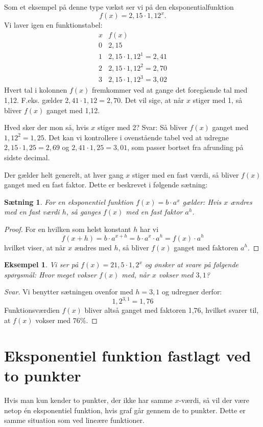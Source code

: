 \documentclass[12pt,oneside,a4paper]{article}
\theoremstyle{plain}
\newtheorem*{thm}{Sætning}
\newtheorem*{eks}{Eksempel}
\begin{document}
Som et eksempel på denne type vækst ser vi på den eksponentialfunktion
$$
f(x) = 2,15 \cdot 1,12^x.
$$
Vi laver igen en funktionstabel:
$$
\begin{array}{r|l}
    x & f(x) \\
    \hline
    0 & 2,15 \\
    1 & 2,15 \cdot 1,12^1 = 2,41 \\
    2 & 2,15 \cdot 1,12^2 = 2,70 \\
    3 & 2,15 \cdot 1,12^3 = 3,02
\end{array}
$$
Hvert tal i kolonnen $f(x)$ fremkommer ved at gange det foregående tal med
1,12. F.eks. gælder $2,41 \cdot 1,12 = 2,70$. Det vil sige, at når $x$ stiger
med 1, så bliver $f(x)$ ganget med 1,12.

Hved sker der mon så, hvis $x$ stiger med 2? Svar: Så bliver $f(x)$ ganget med
$1,12^2 = 1,25$.  Det kan vi kontrollere i ovenstående tabel ved at udregne
$2,15\cdot1,25 = 2,69$ og $2,41\cdot1,25 = 3,01$, som passer bortset fra afrunding på
sidste decimal.

Der gælder helt generelt, at hver gang $x$ stiger med en fast værdi, så bliver
$f(x)$ ganget med en fast faktor. Dette er beskrevet i følgende sætning:

\begin{thm}
    For en eksponentiel funktion $f(x) = b\cdot a^x$ gælder: Hvis $x$ ændres
    med en fast værdi $h$, så ganges $f(x)$ med en fast faktor $a^h$.
\end{thm}
\begin{proof}
    For en hvilken som helst konstant $h$ har vi
    $$
    f(x+h) = b\cdot a^{x+h} = b\cdot a^x\cdot  a^h = f(x)\cdot  a^h
    $$
    hvilket viser, at når $x$ ændres med $h$, så bliver $f(x)$ ganget med
    faktoren $a^h$. 
\end{proof}

\begin{eks}
    Vi ser på $f(x) = 21,5 \cdot 1,2^x$ og ønsker at svare på følgende
    spørgsmål: Hvor meget vokser $f(x)$ med, når $x$ vokser med $3,1$?
\end{eks}
\begin{proof}[Svar]
    Vi benytter sætningen ovenfor med $h=3,1$ og udregner derfor:
    $$
    1,2^{3,1} = 1,76 
    $$
    Funktionsværdien $f(x)$ bliver altså ganget med faktoren 1,76, hvilket
    svarer til, at $f(x)$ vokser med $76\%$.
\end{proof}


\section*{Eksponentiel funktion fastlagt ved to punkter}
Hvis man kun kender to punkter, der ikke har samme $x$-værdi, så vil der være
netop én eksponentiel funktion,
hvis graf går gennem de to punkter. Dette er samme situation som ved lineære
funktioner.
\end{document}
